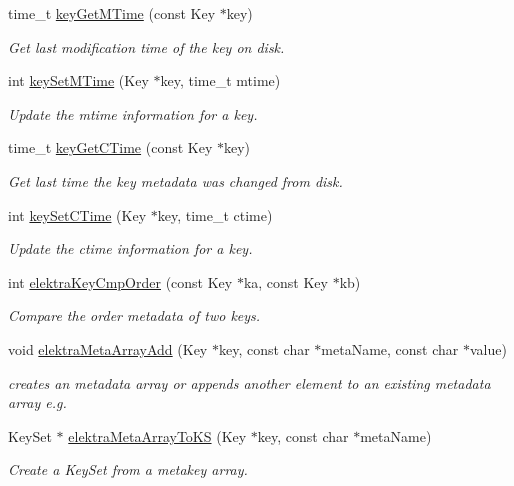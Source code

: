 \begin{DoxyCompactItemize}
time\+\_\+t \hyperlink{group__meta_ga57689eb5691679071463b777ae786ae9}{key\+Get\+M\+Time} (const Key $\ast$key)
\begin{DoxyCompactList}\small\item\em Get last modification time of the key on disk. \end{DoxyCompactList}\item 
int \hyperlink{group__meta_ga481d8997187992fe4bbf288bc8ef4db7}{key\+Set\+M\+Time} (Key $\ast$key, time\+\_\+t mtime)
\begin{DoxyCompactList}\small\item\em Update the mtime information for a key. \end{DoxyCompactList}\item 
time\+\_\+t \hyperlink{group__meta_ga2c213c120cbe02201278ef7fb8cd94be}{key\+Get\+C\+Time} (const Key $\ast$key)
\begin{DoxyCompactList}\small\item\em Get last time the key metadata was changed from disk. \end{DoxyCompactList}\item 
int \hyperlink{group__meta_ga9f502ecab8ab43f0b17220fcc95f3fa5}{key\+Set\+C\+Time} (Key $\ast$key, time\+\_\+t ctime)
\begin{DoxyCompactList}\small\item\em Update the ctime information for a key. \end{DoxyCompactList}\item 
int \hyperlink{group__meta_gab8b30dfabb0867bd6899e60e7bd193a2}{elektra\+Key\+Cmp\+Order} (const Key $\ast$ka, const Key $\ast$kb)
\begin{DoxyCompactList}\small\item\em Compare the order metadata of two keys. \end{DoxyCompactList}\item 
void \hyperlink{group__meta_ga166c65c4eb2d758ced57b0bd74fb9a57}{elektra\+Meta\+Array\+Add} (Key $\ast$key, const char $\ast$meta\+Name, const char $\ast$value)
\begin{DoxyCompactList}\small\item\em creates an metadata array or appends another element to an existing metadata array e.\+g. \end{DoxyCompactList}\item 
Key\+Set $\ast$ \hyperlink{group__meta_gacee3e2d9285dd2bde975a09fdbe50502}{elektra\+Meta\+Array\+To\+KS} (Key $\ast$key, const char $\ast$meta\+Name)
\begin{DoxyCompactList}\small\item\em Create a {\ttfamily Key\+Set} from a metakey array. \end{DoxyCompactList}\item 

\end{DoxyCompactItemize}
